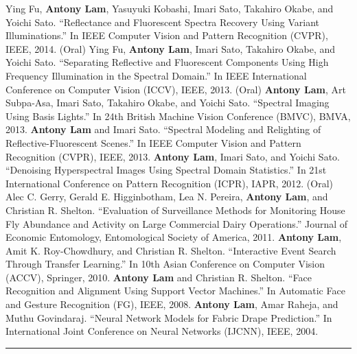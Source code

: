\documentclass[letterpaper,10pt]{article}
\newcommand{\myline}{ \rule{\textwidth}{0.01in} }
\begin{document}
\vspace{0.05in}\newline
Ying Fu, \textbf{Antony Lam}, Yasuyuki Kobashi, Imari Sato, Takahiro Okabe, and Yoichi Sato. ``Reflectance and Fluorescent Spectra Recovery Using Variant Illuminations.'' In IEEE Computer Vision and Pattern Recognition (CVPR), IEEE, 2014. (Oral)
\vspace{0.05in}\newline\newline\newline
Ying Fu, \textbf{Antony Lam}, Imari Sato, Takahiro Okabe, and Yoichi Sato. ``Separating Reflective and Fluorescent Components Using High Frequency Illumination in the Spectral Domain.'' In IEEE International Conference on Computer Vision (ICCV), IEEE, 2013. (Oral)
\vspace{0.05in}\newline
\textbf{Antony Lam}, Art Subpa-Asa, Imari Sato, Takahiro Okabe, and Yoichi Sato. ``Spectral Imaging Using Basis Lights.'' In 24th British Machine Vision Conference (BMVC), BMVA, 2013.
\vspace{0.05in}\newline
\textbf{Antony Lam} and Imari Sato. ``Spectral Modeling and Relighting of Reflective-Fluorescent Scenes.'' In IEEE Computer Vision and Pattern Recognition (CVPR), IEEE, 2013.
\vspace{0.05in}\newline
\textbf{Antony Lam}, Imari Sato, and Yoichi Sato. ``Denoising Hyperspectral Images Using Spectral Domain Statistics.'' In 21st International Conference on Pattern Recognition (ICPR), IAPR, 2012. (Oral)
\vspace{0.05in}\newline
Alec C. Gerry, Gerald E. Higginbotham, Lea N. Pereira, \textbf{Antony Lam}, and Christian R. Shelton. ``Evaluation of Surveillance Methods for Monitoring House Fly Abundance and Activity on Large Commercial Dairy Operations.'' Journal of Economic Entomology, Entomological Society of America, 2011.
\vspace{0.05in}\newline
\textbf{Antony Lam}, Amit K. Roy-Chowdhury, and Christian R. Shelton. ``Interactive Event Search Through Transfer Learning.'' In 10th Asian Conference on Computer Vision (ACCV), Springer, 2010.
\vspace{0.05in}\newline
\textbf{Antony Lam} and Christian R. Shelton. ``Face Recognition and Alignment Using Support Vector Machines.'' In Automatic Face and Gesture Recognition (FG), IEEE, 2008.
\vspace{0.05in}\newline
\textbf{Antony Lam}, Amar Raheja, and Muthu Govindaraj. ``Neural Network Models for Fabric Drape Prediction.'' In International Joint Conference on Neural Networks (IJCNN), IEEE, 2004.
\myline
\end{document}
